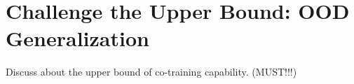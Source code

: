 \section{Challenge the Upper Bound: OOD Generalization}

\begin{tcolorbox}[colframe=violetblue, opacityback=0.9, title=TODO]
Discuss about the upper bound of co-training capability. (MUST!!!)
\end{tcolorbox}